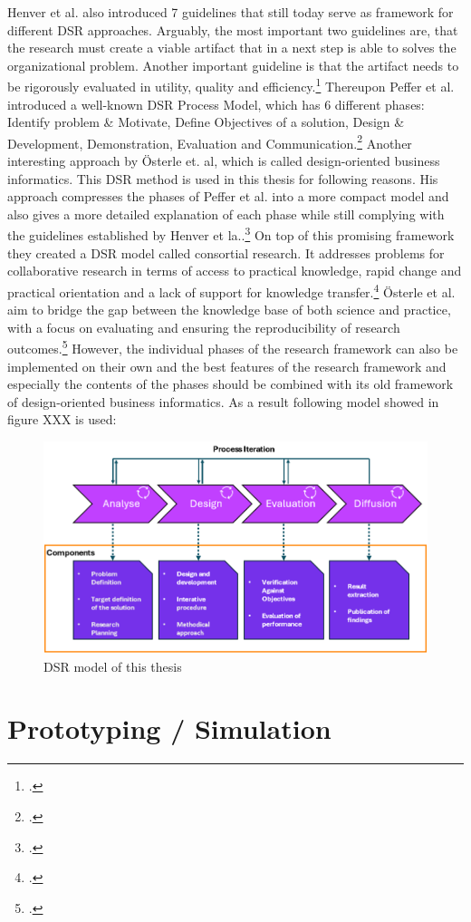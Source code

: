 Henver et al. also introduced 7 guidelines that still today serve as framework for different \ac{DSR} approaches.
Arguably, the most important two guidelines are, that the research must create a viable artifact that in a next step is able to solves the organizational problem. 
Another important guideline is that the artifact needs to be rigorously evaluated in utility, quality and efficiency.\footcite[83]{hevnerDesignScienceInformation2004a}
Thereupon Peffer et al. introduced a well-known \ac{DSR} Process Model, which has 6 different phases: Identify problem \& Motivate, Define Objectives of a solution, 
Design \& Development, Demonstration, Evaluation and Communication.\footcite[cf.][54]{peffersDesignScienceResearch2007a}
Another interesting approach by Österle et. al, which is called design-oriented business informatics. 
This \ac{DSR} method is used in this thesis for following reasons.
His approach compresses the phases of Peffer et al. into a more compact model and also gives a more detailed explanation of each phase while still complying with the guidelines established by Henver et la..\footcite[cf.][1-6]{oesterleMemorandumZurGestaltungsorientierten2010}
On top of this promising framework they created a \ac{DSR} model called consortial research.
It addresses problems for collaborative research in terms of access to practical knowledge, rapid change and practical orientation and a lack of support for knowledge transfer.\footcite[cf.][273-274]{oesterleKonsortialforschung2010}
Österle et al. aim to bridge the gap between the knowledge base of both science and practice, with a focus on evaluating and ensuring the reproducibility of research outcomes.\footcite[cf.][5]{oesterleMemorandumZurGestaltungsorientierten2010}
However, the individual phases of the research framework can also be implemented on their own and the best features 
of the research framework and especially the contents of the phases should be combined with its old framework of design-oriented business informatics.
As a result following model showed in figure XXX is used:
\begin{figure}[H]
    \centering
    \includegraphics[width=1\linewidth]{graphics/DSR_Modell.png}
    \caption{\ac{DSR} model of this thesis\protect\footnotemark}
    \label{DSR_Modell}
\end{figure}


\section{Prototyping / Simulation}

